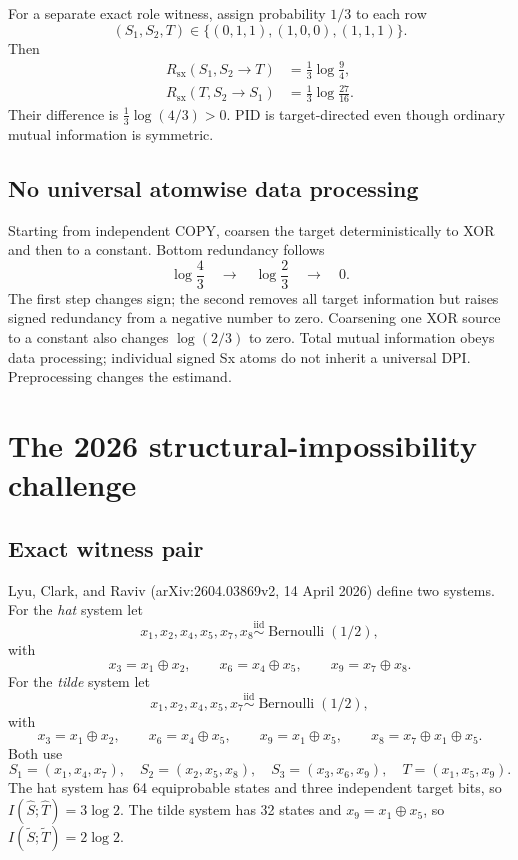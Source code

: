 \documentclass[11pt]{article}
\newcommand{\Sx}{\mathrm{sx}}
\begin{document}
For a separate exact role witness, assign probability $1/3$ to each row
\[
(S_1,S_2,T)\in\{(0,1,1),(1,0,0),(1,1,1)\}.
\]
Then
\begin{align}
R_{\Sx}(S_1,S_2\to T)&=\frac13\log\frac94,\label{eq:role-a}\\
R_{\Sx}(T,S_2\to S_1)&=\frac13\log\frac{27}{16}.
\label{eq:role-b}
\end{align}
Their difference is $\frac13\log(4/3)>0$.  PID is target-directed even though
ordinary mutual information is symmetric.

\subsection{No universal atomwise data processing}

Starting from independent COPY, coarsen the target deterministically to XOR
and then to a constant.  Bottom redundancy follows
\begin{equation}
\log\frac43\quad\longrightarrow\quad\log\frac23
\quad\longrightarrow\quad0.
\label{eq:coarse}
\end{equation}
The first step changes sign; the second removes all target information but
raises signed redundancy from a negative number to zero.  Coarsening one XOR
source to a constant also changes $\log(2/3)$ to zero.  Total mutual information
obeys data processing; individual signed Sx atoms do not inherit a universal
DPI\@.  Preprocessing changes the estimand.

\section{The 2026 structural-impossibility challenge}
\label{sec:lcr}

\subsection{Exact witness pair}

Lyu, Clark, and Raviv (arXiv:2604.03869v2, 14 April 2026) define two systems.
For the \emph{hat} system let
\[
x_1,x_2,x_4,x_5,x_7,x_8\stackrel{\mathrm{iid}}{\sim}
\operatorname{Bernoulli}(1/2),
\]
with
\[
x_3=x_1\oplus x_2,\qquad x_6=x_4\oplus x_5,
\qquad x_9=x_7\oplus x_8.
\]
For the \emph{tilde} system let
\[
x_1,x_2,x_4,x_5,x_7\stackrel{\mathrm{iid}}{\sim}
\operatorname{Bernoulli}(1/2),
\]
with
\[
x_3=x_1\oplus x_2,\qquad x_6=x_4\oplus x_5,
\qquad x_9=x_1\oplus x_5,
\qquad x_8=x_7\oplus x_1\oplus x_5.
\]
Both use
\begin{equation}
S_1=(x_1,x_4,x_7),\quad
S_2=(x_2,x_5,x_8),\quad
S_3=(x_3,x_6,x_9),\quad
T=(x_1,x_5,x_9).
\label{eq:lcr-system}
\end{equation}
The hat system has 64 equiprobable states and three independent target bits,
so $I(\widehat S;\widehat T)=3\log2$.  The tilde system has 32 states and
$x_9=x_1\oplus x_5$, so $I(\widetilde S;\widetilde T)=2\log2$.
\end{document}
